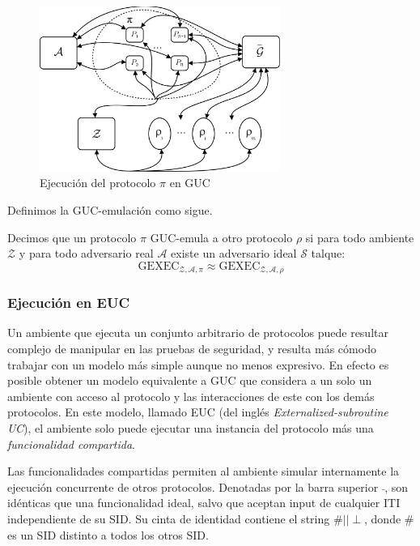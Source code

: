 \begin{figure}[hp]
    \centering
    \includegraphics[width=0.7\textwidth]{figs/mundo_real_guc}
    \caption{Ejecución del protocolo $\pi$ en GUC}
    \label{fig:mundo_real_guc}
\end{figure}

Definimos la GUC-emulación como sigue.

\begin{definicion}
Decimos que un protocolo $\pi$ GUC-emula a otro protocolo $\rho$ si para todo ambiente $\mathcal{Z}$
y para todo adversario real $\mathcal{A}$ existe un adversario ideal $\mathcal{S}$ talque:
$$\mathrm{GEXEC}_{\mathcal{Z}, \mathcal{A}, \mathcal{\pi}}
\approx
\mathrm{GEXEC}_{\mathcal{Z}, \mathcal{A}, \mathcal{\rho}}$$
\end{definicion}

\subsubsection{Ejecución en EUC}
Un ambiente que ejecuta un conjunto arbitrario de protocolos puede resultar complejo de manipular en las
pruebas de seguridad, y resulta más cómodo trabajar con un modelo más simple aunque no menos expresivo.
En efecto es posible obtener un modelo equivalente a GUC que considera a un  solo un ambiente  con acceso
al protocolo y las interacciones de este con los demás protocolos. En este modelo, llamado EUC (del inglés
\textit{Externalized-subroutine UC}), el ambiente solo puede ejecutar una instancia del protocolo más una
\textit{funcionalidad compartida}.

Las funcionalidades compartidas permiten al ambiente simular internamente la ejecución concurrente de
otros protocolos. Denotadas por la barra superior $\bar{}$, son idénticas que una funcionalidad
ideal, salvo que aceptan input de cualquier ITI independiente de su SID. Su cinta de identidad contiene
el string $\#||\perp$, donde $\#$ es un SID distinto a todos los otros SID.\\

